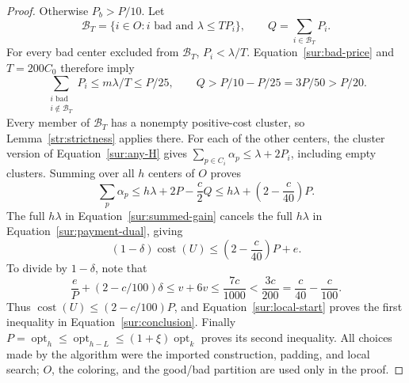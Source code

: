 \begin{proof}
Otherwise $P_b>P/10$.  Let
\[
 \mathcal B_T=\{i\in O:i\text{ bad and }\lambda\le TP_i\},
 \qquad Q=\sum_{i\in\mathcal B_T}P_i.
\]
For every bad center excluded from $\mathcal B_T$, $P_i<\lambda/T$.
Equation~\eqref{sur:bad-price} and $T=200C_0$ therefore imply
\[
 \sum_{\substack{i\text{ bad}\\i\notin\mathcal B_T}}P_i
 \le m\lambda/T\le P/25,
 \qquad Q>P/10-P/25=3P/50>P/20.
\]
Every member of $\mathcal B_T$ has a nonempty positive-cost cluster,
so Lemma~\ref{str:strictness} applies there.  For each of the other
centers, the cluster version of Equation~\eqref{sur:any-H} gives
$\sum_{p\in C_i}\alpha_p\le\lambda+2P_i$, including empty clusters.
Summing over all $h$ centers of $O$ proves
\begin{equation}\label{sur:summed-gain}
 \sum_p\alpha_p
 \le h\lambda+2P-\frac c2Q
 \le h\lambda+\left(2-\frac c{40}\right)P.
\end{equation}
The full $h\lambda$ in Equation~\eqref{sur:summed-gain} cancels the
full $h\lambda$ in Equation~\eqref{sur:payment-dual}, giving
\[
 (1-\delta)\operatorname{cost}(U)
 \le\left(2-\frac c{40}\right)P+e.
\]
To divide by $1-\delta$, note that
\[
 \frac eP+(2-c/100)\delta
 \le v+6v\le\frac{7c}{1000}<\frac{3c}{200}
 =\frac c{40}-\frac c{100}.
\]
Thus $\operatorname{cost}(U)\le(2-c/100)P$, and
Equation~\eqref{sur:local-start} proves the first inequality in
Equation~\eqref{sur:conclusion}.  Finally
$P=\operatorname{opt}_h\le\operatorname{opt}_{h-L}
\le(1+\xi)\operatorname{opt}_k$ proves its second inequality.
All choices made by the algorithm were the imported construction,
padding, and local search; $O$, the coloring, and the good/bad partition
are used only in the proof.
\end{proof}
